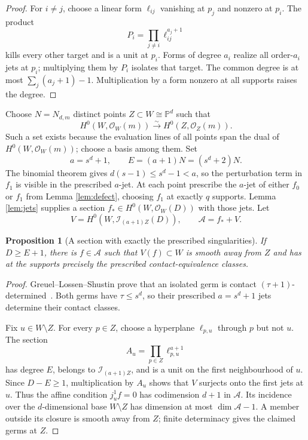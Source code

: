 \documentclass[11pt,a4paper]{article}
\newtheorem{proposition}[theorem]{Proposition}
\theoremstyle{definition}
\newcommand{\PP}{\mathbb P}
\newcommand{\cO}{\mathcal O}
\newcommand{\cI}{\mathcal I}
\begin{document}
\begin{proof}
For $i\ne j$, choose a linear form $\ell_{ij}$ vanishing at $p_j$ and
nonzero at $p_i$.  The product
\[
 P_i=\prod_{j\ne i}\ell_{ij}^{a_j+1}
\]
kills every other target and is a unit at $p_i$.  Forms of degree $a_i$
realize all order-$a_i$ jets at $p_i$; multiplying them by $P_i$ isolates
that target.  The common degree is at most $\sum_j(a_j+1)-1$.
Multiplication by a form nonzero at all supports raises the degree.
\end{proof}

Choose $N=N_{d,m}$ distinct points $Z\subset W\cong\PP^d$ such that
\[
 H^0(W,\cO_W(m))\xrightarrow{\sim}H^0(Z,\cO_Z(m)).       \tag{13}
\]
Such a set exists because the evaluation lines of all points span the dual
of $H^0(W,\cO_W(m))$; choose a basis among them.  Set
\[
a=s^d+1,\qquad E=(a+1)N=(s^d+2)N.
\]
The binomial theorem gives $d(s-1)\le s^d-1<a$, so the perturbation term in
$f_1$ is visible in the prescribed $a$-jet.
At each point prescribe the $a$-jet of either $f_0$ or $f_1$ from Lemma
\ref{lem:defect}, choosing $f_1$ at exactly $q$ supports.  Lemma
\ref{lem:jets} supplies a section $f_*\in H^0(W,\cO_W(D))$ with those jets.
Let
\[
 V=H^0(W,\cI_{(a+1)Z}(D)),\qquad \mathcal A=f_*+V.
\]

\begin{proposition}[A section with exactly the prescribed singularities]\label{prop:section}
If $D\ge E+1$, there is $f\in\mathcal A$ such that $V(f)\subset W$ is
smooth away from $Z$ and has at the supports precisely the prescribed
contact-equivalence classes.
\end{proposition}

\begin{proof}
Greuel--Lossen--Shustin prove that an isolated germ is contact
$(\tau+1)$-determined~\cite[Corollary~2.24]{GreuelLossenShustin2007}.
Both germs have $\tau\le s^d$, so their prescribed $a=s^d+1$ jets determine
their contact classes.

Fix $u\in W\setminus Z$.  For every $p\in Z$, choose a hyperplane
$\ell_{p,u}$ through $p$ but not $u$.  The section
\[
 A_u=\prod_{p\in Z}\ell_{p,u}^{a+1}
\]
has degree $E$, belongs to $\cI_{(a+1)Z}$, and is a unit on the first
neighbourhood of $u$.  Since $D-E\ge1$, multiplication by $A_u$ shows that
$V$ surjects onto the first jets at $u$.  Thus the affine condition
$j^1_u f=0$ has codimension $d+1$ in $\mathcal A$.  Its incidence over the
$d$-dimensional base $W\setminus Z$ has dimension at most
$\dim\mathcal A-1$.  A member outside its closure is smooth away from $Z$;
finite determinacy gives the claimed germs at $Z$.
\end{proof}
\end{document}

